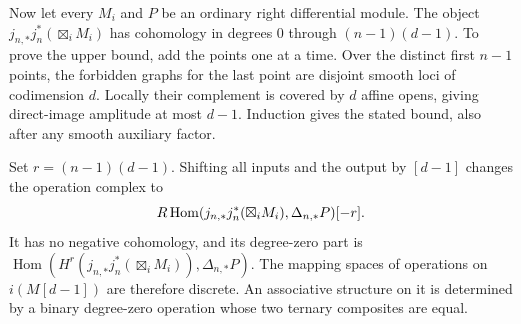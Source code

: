 Now let every $M_i$ and $P$ be an ordinary right differential module.
The object $j_{n,*}j_n^*(\boxtimes_iM_i)$ has cohomology in
degrees $0$ through $(n-1)(d-1)$. To prove the upper bound,
add the points one at a time. Over the distinct first $n-1$
points, the forbidden graphs for the last point are disjoint
smooth loci of codimension $d$. Locally their complement is
covered by $d$ affine opens, giving direct-image amplitude at
most $d-1$. Induction gives the stated bound, also after any
smooth auxiliary factor.

Set $r=(n-1)(d-1)$. Shifting all inputs and the output by $[d-1]$
changes the operation complex to
\[
 R\operatorname{Hom}(j_{n,*}j_n^*(\boxtimes_iM_i),\Delta_{n,*}P)[-r].
\]
It has no negative cohomology, and its degree-zero part is
$\operatorname{Hom}(H^r(j_{n,*}j_n^*(\boxtimes_iM_i)),\Delta_{n,*}P)$.
The mapping spaces of operations on $i(M[d-1])$ are therefore
discrete. An associative structure on it is determined by a binary
degree-zero operation whose two ternary composites are equal.

